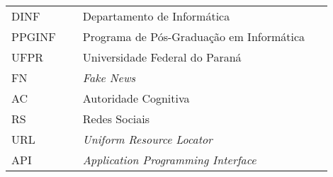 

\begin{listaacron}

\begin{longtable}{p{0.2\linewidth}p{0.7\linewidth}}
DINF & Departamento de Informática\\
PPGINF & Programa de Pós-Graduação em Informática\\
UFPR & Universidade Federal do Paraná\\
FN & \emph{Fake News}\\
AC & Autoridade Cognitiva\\
RS & Redes Sociais \\
URL & \emph{Uniform Resource Locator} \\
API & \emph{Application Programming Interface} \\
\end{longtable}

\end{listaacron}

